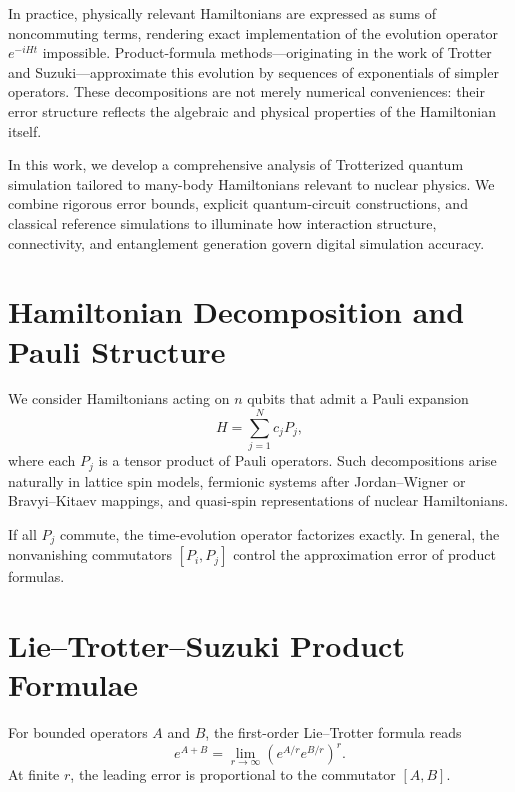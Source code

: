 \documentclass[
  aps,
  prxquantum,
  reprint,
  superscriptaddress,
  nofootinbib
]{revtex4-2}
\begin{document}
In practice, physically relevant Hamiltonians are expressed as sums of
noncommuting terms, rendering exact implementation of the evolution operator
$e^{-iHt}$ impossible. Product-formula methods---originating in the work of
Trotter and Suzuki---approximate this evolution by sequences of exponentials of
simpler operators. These decompositions are not merely numerical conveniences:
their error structure reflects the algebraic and physical properties of the
Hamiltonian itself.

In this work, we develop a comprehensive analysis of Trotterized quantum
simulation tailored to many-body Hamiltonians relevant to nuclear physics. We
combine rigorous error bounds, explicit quantum-circuit constructions, and
classical reference simulations to illuminate how interaction structure,
connectivity, and entanglement generation govern digital simulation accuracy.

\section{Hamiltonian Decomposition and Pauli Structure}

We consider Hamiltonians acting on $n$ qubits that admit a Pauli expansion
\begin{equation}
H = \sum_{j=1}^N c_j P_j,
\end{equation}
where each $P_j$ is a tensor product of Pauli operators.
Such decompositions arise naturally in lattice spin models, fermionic systems
after Jordan--Wigner or Bravyi--Kitaev mappings, and quasi-spin representations of
nuclear Hamiltonians.

If all $P_j$ commute, the time-evolution operator factorizes exactly. In general,
the nonvanishing commutators $[P_i,P_j]$ control the approximation error of
product formulas.

\section{Lie--Trotter--Suzuki Product Formulae}

For bounded operators $A$ and $B$, the first-order Lie--Trotter formula reads
\begin{equation}
e^{A+B} = \lim_{r\to\infty} \left(e^{A/r}e^{B/r}\right)^r.
\end{equation}
At finite $r$, the leading error is proportional to the commutator $[A,B]$.
\end{document}

